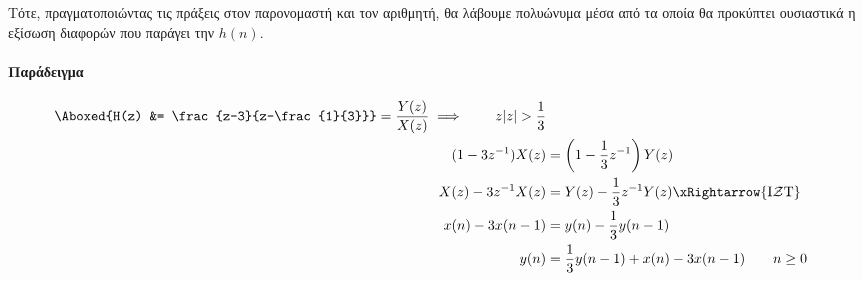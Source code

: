 \documentclass[11pt,a4paper,notitlepage,fleqn]{article}
\begin{document}
Τότε, πραγματοποιώντας τις πράξεις στον παρονομαστή και τον αριθμητή, θα λάβουμε πολυώνυμα μέσα από
τα οποία θα προκύπτει ουσιαστικά η εξίσωση διαφορών που παράγει την \( h(n) \).

\paragraph{Παράδειγμα}
\begin{align*}
	\Aboxed{H(z) &= \frac{z-3}{z-\frac{1}{3}}} = \frac{Y(z)}{X(z)} \implies \qquad z |z|>\frac{1}{3}
	\\ (1-3z^{-1})X(z) &= \left(1-\frac{1}{3}z^{-1}\right)Y(z)\\
	X(z) - 3z^{-1}X(z) &= Y(z)-\frac{1}{3}z^{-1} Y(z) \xRightarrow{\text{I}\mathcal{Z}\text{T}} \\
	x(n) - 3x(n-1) &= y(n) - \frac{1}{3}y(n-1) \\
	y(n) &= \frac{1}{3}y(n-1) + x(n) -3x(n-1) \qquad n\geq 0
\end{align*}
\end{document}
